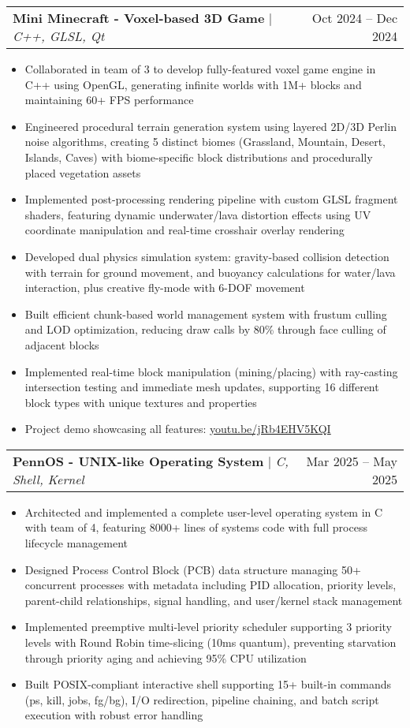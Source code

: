 \documentclass[letterpaper,11pt]{article}
\makeatletter
\newcommand{\resumeItem}[1]{
  \item\small{
    {#1 \vspace{-3pt}}
  }
}
\newcommand{\resumeProjectHeading}[2]{
    \item
    \begin{tabular*}{0.97\textwidth}{l@{\extracolsep{\fill}}r}
      \small#1 & #2 \\
    \end{tabular*}\vspace{-7pt}
}
\newcommand{\resumeItemListStart}{\begin{itemize}}
\newcommand{\resumeItemListEnd}{\end{itemize}\vspace{-5pt}}
\makeatother
\begin{document}
\resumeProjectHeading
      {\textbf{Mini Minecraft - Voxel-based 3D Game} $|$ \emph{C++, GLSL, Qt}}{Oct 2024 -- Dec 2024}
      \resumeItemListStart
      \resumeItem{Collaborated in team of 3 to develop fully-featured voxel game engine in C++ using OpenGL, generating infinite worlds with 1M+ blocks and maintaining 60+ FPS performance}
      \resumeItem{Engineered procedural terrain generation system using layered 2D/3D Perlin noise algorithms, creating 5 distinct biomes (Grassland, Mountain, Desert, Islands, Caves) with biome-specific block distributions and procedurally placed vegetation assets}
      \resumeItem{Implemented post-processing rendering pipeline with custom GLSL fragment shaders, featuring dynamic underwater/lava distortion effects using UV coordinate manipulation and real-time crosshair overlay rendering}
      \resumeItem{Developed dual physics simulation system: gravity-based collision detection with terrain for ground movement, and buoyancy calculations for water/lava interaction, plus creative fly-mode with 6-DOF movement}
      \resumeItem{Built efficient chunk-based world management system with frustum culling and LOD optimization, reducing draw calls by 80\% through face culling of adjacent blocks}
      \resumeItem{Implemented real-time block manipulation (mining/placing) with ray-casting intersection testing and immediate mesh updates, supporting 16 different block types with unique textures and properties}
      \resumeItem{Project demo showcasing all features: \href{https://youtu.be/jRb4EHV5KQI}{youtu.be/jRb4EHV5KQI}}
      \resumeItemListEnd

      \resumeProjectHeading
      {\textbf{PennOS - UNIX-like Operating System} $|$ \emph{C, Shell, Kernel}}{Mar 2025 -- May 2025}
      \resumeItemListStart
        \resumeItem{Architected and implemented a complete user-level operating system in C with team of 4, featuring 8000+ lines of systems code with full process lifecycle management}
        \resumeItem{Designed Process Control Block (PCB) data structure managing 50+ concurrent processes with metadata including PID allocation, priority levels, parent-child relationships, signal handling, and user/kernel stack management}
        \resumeItem{Implemented preemptive multi-level priority scheduler supporting 3 priority levels with Round Robin time-slicing (10ms quantum), preventing starvation through priority aging and achieving 95\% CPU utilization}
        \resumeItem{Built POSIX-compliant interactive shell supporting 15+ built-in commands (ps, kill, jobs, fg/bg), I/O redirection, pipeline chaining, and batch script execution with robust error handling}
      \resumeItemListEnd
      
\end{document}
